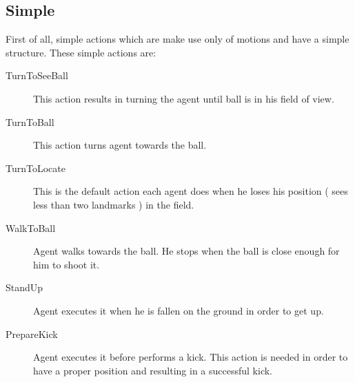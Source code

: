 \subsection{Simple}
First of all, simple actions which are make use only of motions and have a simple structure. These simple actions are:
\begin{description}
 \item[TurnToSeeBall] This action results in turning the agent until ball is in his field of view.
 \item[TurnToBall] This action turns agent towards the ball.
 \item[TurnToLocate] This is the default action each agent does when he loses his position ( sees less than two landmarks ) in the field.
 \item[WalkToBall] Agent walks towards the ball. He stops when the ball is close enough for him to shoot it.
 \item[StandUp] Agent executes it when he is fallen on the ground in order to get up.
 \item[PrepareKick] Agent executes it before performs a kick. This action is needed in order to have a proper position and resulting in a successful kick.
\end{description}

